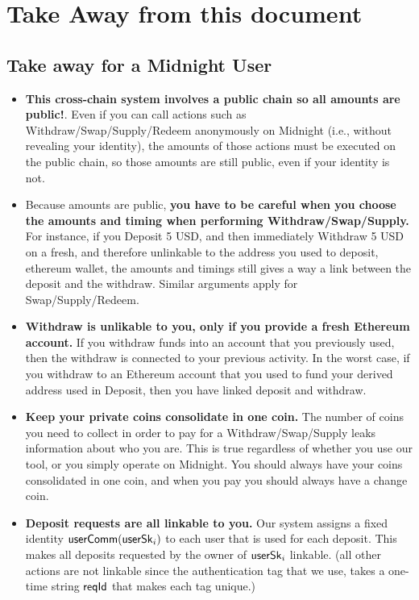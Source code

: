 \section{Take Away from this document}
\label{sec:conclusions}



\subsection{Take away for a Midnight User}

\begin{itemize}
    \item \textbf{This  cross-chain system  involves a  public chain so all amounts are public!}.
Even if you can call actions  such as Withdraw/Swap/Supply/Redeem anonymously on Midnight (i.e., without revealing your identity),  the amounts of those actions   must be executed on the public chain, so those amounts  are still public, even if your identity is not.
\item Because amounts are public, \textbf{you have to be careful when you choose the amounts and timing when performing  Withdraw/Swap/Supply.}
For instance,  if you Deposit  5 USD, and then immediately Withdraw 5 USD on a fresh, and therefore unlinkable to the address you used to deposit,  ethereum wallet, the amounts and timings still gives a way a link between the deposit and the withdraw.
Similar arguments apply for Swap/Supply/Redeem.



\item \textbf{Withdraw is unlikable to you,   only if you provide a fresh Ethereum account.}
If you withdraw funds into an account that you previously used, then the withdraw is connected to your previous activity.
In the worst case, if you withdraw to an Ethereum account that you used to fund your  derived address used in Deposit, then you have linked deposit and withdraw.

\item \textbf{Keep your private coins consolidate in one coin. }
The number of coins you need to collect in order to pay for a Withdraw/Swap/Supply
leaks information about who you are.
This is true regardless of whether you use our tool, or you simply operate on Midnight.
You should always have your coins consolidated in one coin, and when you pay you should always have a change coin.



\item  \textbf{Deposit requests are all linkable to you. }
Our system assigns a fixed identity $\mathsf{userComm}(\mathsf{userSk}_i)$ to each user that is used for each deposit.
This makes all deposits requested by the owner of  $\mathsf{userSk}_i$ linkable.
(all other actions are not linkable since the authentication tag that we use, takes a one-time string $\mathsf{reqId}$ that makes each tag unique.)



\end{itemize}
